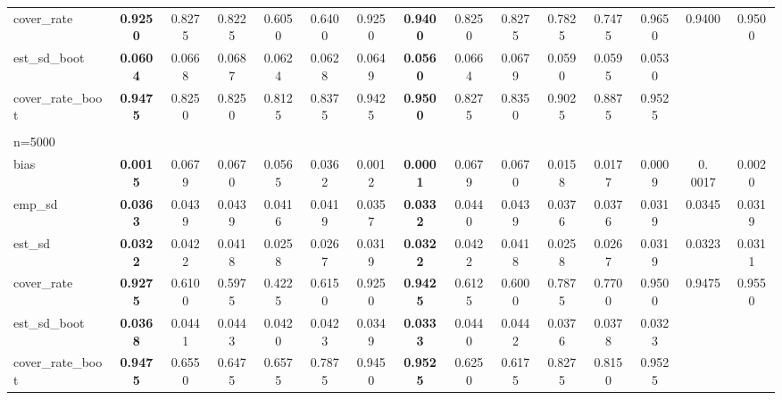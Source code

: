 \documentclass[11pt]{article}
\numberwithin{equation}{section}
\begin{document}
\begin{table}[]
{\begin{tabular}{lcccccccccccccc}
			cover\_rate & \textbf{0.9250} & 0.8275 & 0.8225 & 0.6050 & 0.6400 & 0.9250 & \textbf{0.9400} & 0.8250 & 0.8275 & 0.7825 & 0.7475 & 0.9650 & 0.9400 & 0.9500 \\
			est\_sd\_boot & \textbf{0.0604} & 0.0668 & 0.0687 & 0.0624 & 0.0628 & 0.0649 & \textbf{0.0560} & 0.0664 & 0.0679 & 0.0590 & 0.0595 & 0.0530 &  &  \\
			cover\_rate\_boot & \textbf{0.9475} & 0.8250 & 0.8250 & 0.8125 & 0.8375 & 0.9425 & \textbf{0.9500} & 0.8275 & 0.8350 & 0.9025 & 0.8875 & 0.9525 &  &  \\
			\\
			n=5000 &  &  &  &  &  &  &  &  &  &  &  &  &  &  \\
			\hline
			bias & \textbf{0.0015} & 0.0679 & 0.0670 & 0.0565 & 0.0362 & 0.0012 & \textbf{0.0001} & 0.0679 & 0.0670 & 0.0158 & 0.0177 & 0.0009 & 0. 0017 & 0.0020 \\
			emp\_sd & \textbf{0.0363} & 0.0439 & 0.0439 & 0.0416 & 0.0419 & 0.0357 & \textbf{0.0332} & 0.0440 & 0.0439 & 0.0376 & 0.0376 & 0.0319 & 0.0345 & 0.0319 \\
			est\_sd & \textbf{0.0322} & 0.0422 & 0.0418 & 0.0258 & 0.0267 & 0.0319 & \textbf{0.0322} & 0.0422 & 0.0418 & 0.0258 & 0.0267 & 0.0319 & 0.0323 & 0.0311 \\
			cover\_rate & \textbf{0.9275} & 0.6100 & 0.5975 & 0.4225 & 0.6150 & 0.9250 & \textbf{0.9425} & 0.6125 & 0.6000 & 0.7875 & 0.7700 & 0.9500 & 0.9475 & 0.9550 \\
			est\_sd\_boot & \textbf{0.0368} & 0.0441 & 0.0443 & 0.0420 & 0.0423 & 0.0349 & \textbf{0.0333} & 0.0440 & 0.0442 & 0.0376 & 0.0378 & 0.0323 &  &  \\
			cover\_rate\_boot & \textbf{0.9475} & 0.6550 & 0.6475 & 0.6575 & 0.7875 & 0.9450 & \textbf{0.9525} & 0.6250 & 0.6175 & 0.8275 & 0.8150 & 0.9525 &  & \\
			\hline
		\end{tabular}
		\label{tab:simu_average_ate_p10}
	}
	
\end{table}
\end{document}
